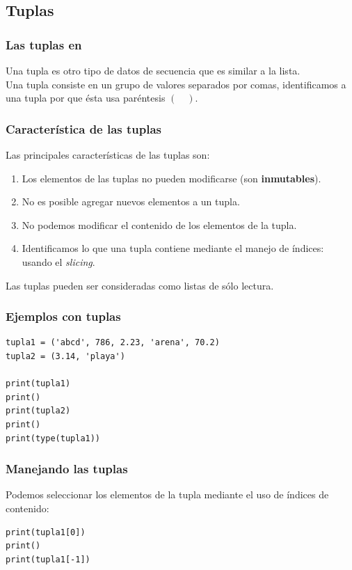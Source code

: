 \documentclass[12pt]{beamer}
\begin{document}
\subsection{Tuplas}

\begin{frame}
\frametitle{Las tuplas en \python}
Una tupla es otro tipo de datos de secuencia que es similar a la lista.
\\
\bigskip
\pause
Una tupla consiste en un grupo de valores separados por comas, identificamos a una tupla por que ésta usa paréntesis $( \quad )$.
\end{frame}
\begin{frame}
\frametitle{Característica de las tuplas}
Las principales características de las tuplas son:
\pause
{}
\begin{enumerate}[<+->]
\item Los elementos de las tuplas no pueden modificarse (son \textbf{inmutables}).
\item No es posible agregar nuevos elementos a un tupla.
\item No podemos modificar el contenido de los elementos de la tupla.
\item Identificamos lo que una tupla contiene mediante el manejo de índices: usando el \emph{slicing}.
\end{enumerate}
\pause
Las tuplas pueden ser consideradas como listas de sólo lectura.
\end{frame}
\begin{frame}[fragile]
\frametitle{Ejemplos con tuplas}
\begin{lstlisting}[caption=Definiendo tuplas]
tupla1 = ('abcd', 786, 2.23, 'arena', 70.2)
tupla2 = (3.14, 'playa')

print(tupla1)
print()
print(tupla2)
print()
print(type(tupla1))
\end{lstlisting}
\end{frame}
\begin{frame}[fragile]
\frametitle{Manejando las tuplas}
Podemos seleccionar los elementos de la tupla mediante el uso de índices de contenido:
\pause
\begin{lstlisting}[caption=Recuperando elementos de una tupla]
print(tupla1[0])
print()
print(tupla1[-1])
\end{lstlisting}
\end{frame}
\end{document}
